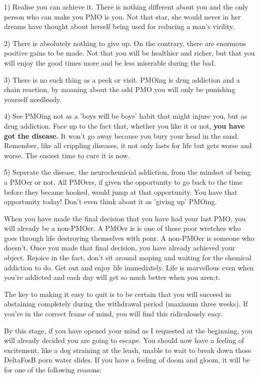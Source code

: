   1) Realise you can achieve it. There is nothing different about you and the only person who can make you PMO is you. Not that star, she would never in her dreams have thought about herself being used for reducing a man's virility.

  2) There is absolutely nothing to give up. On the contrary, there are enormous positive gains to be made. Not that you will be healthier and richer, but that you will enjoy the good times more and be less miserable during the bad.

  3) There is no such thing as a peek or visit. PMOing is drug addiction and a chain reaction, by moaning about the odd PMO you will only be punishing yourself needlessly.

  4) See PMOing not as a 'boys will be boys' habit that might injure you, but as drug addiction. Face up to the fact that, whether you like it or not, \textbf{you have got the disease.} It won't go away because you bury your head in the sand. Remember, like all crippling diseases, it not only lasts for life but gets worse and worse. The easiest time to cure it is now.

  5) Seperate the disease, the neurochemicial addiction, from the mindset of being a PMOer or not. All PMOers, if given the opportunity to go back to the time before they became hooked, would jump at that opportunity. You have that opportunity today! Don't even think about it as 'giving up' PMOing.

When you have made the final decision that you have had your last PMO, you will already be a non-PMOer. A PMOer is is one of those poor wretches who goes through life destroying themselves with ponr. A non-PMOer is someone who doesn't. Once you made that final decision, you have already achieved your object. Rejoice in the fact, don't sit around moping and waiting for the chemical addiction to do. Get out and enjoy life immediately. Life is marvellous even when you're addicted and each day will get so much better when you aren;t.

The key to making it easy to quit is to be certain that you will succeed in abstaining completely during the withdrawal period (maximum three weeks). If you're in the correct frame of mind, you will find this ridiculously easy.

By this stage, if you have opened your mind as I requested at the beginning, you will already decided you are going to escape. You should now have a feeling of excitement, like a dog straining at the leash, unable to wait to break down those DeltaFosB porn water slides. If you have a feeling of doom and gloom, it will be for one of the following reasons:

